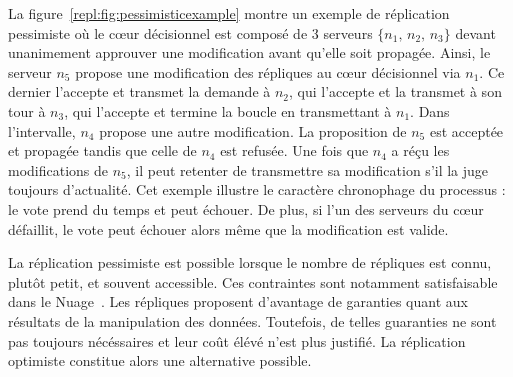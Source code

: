 \begin{figure*}
  \centering
  \hspace{40pt}
  \hspace{10pt}
  \caption{\label{repl:fig:pessimisticexample} Exemple de quorum en réplication
    pessimiste. La modification de $n_5$ est propagée.}
\end{figure*}

La figure~\ref{repl:fig:pessimisticexample} montre un exemple de réplication
pessimiste où le cœur décisionnel est composé de 3 serveurs
$\{n_1,\, n_2,\, n_3\}$ devant unanimement approuver une modification avant
qu'elle soit propagée. Ainsi, le serveur $n_5$ propose une modification des
répliques au cœur décisionnel via $n_1$. Ce dernier l'accepte et transmet la
demande à $n_2$, qui l'accepte et la transmet à son tour à $n_3$, qui l'accepte
et termine la boucle en transmettant à $n_1$.  Dans l'intervalle, $n_4$ propose
une autre modification. La proposition de $n_5$ est acceptée et propagée tandis
que celle de $n_4$ est refusée. Une fois que $n_4$ a réçu les modifications de
$n_5$, il peut retenter de transmettre sa modification s'il la juge toujours
d'actualité. Cet exemple illustre le caractère chronophage du processus : le
vote prend du temps et peut échouer. De plus, si l'un des serveurs du cœur
défaillit, le vote peut échouer alors même que la modification est valide.

La réplication pessimiste est possible lorsque le nombre de répliques est connu,
plutôt petit, et souvent accessible. Ces contraintes sont notamment
satisfaisable dans le Nuage~\cite{mell2011national}. Les répliques proposent
d'avantage de garanties quant aux résultats de la manipulation des
données. Toutefois, de telles guaranties ne sont pas toujours nécéssaires et
leur coût élévé n'est plus justifié. La réplication optimiste constitue alors
une alternative possible.

